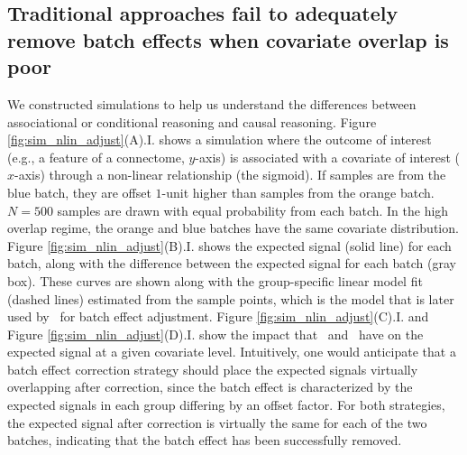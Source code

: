 \subsection{Traditional approaches fail to adequately remove batch effects when covariate overlap is poor}
\label{sec:results:sims}
We constructed simulations to help us understand the differences between associational or conditional reasoning and causal reasoning. Figure \ref{fig:sim_nlin_adjust}(A).I. shows a simulation where the outcome of interest (e.g., a feature of a connectome, $y$-axis) is associated with a covariate of interest ($x$-axis) through a non-linear relationship (the sigmoid). If samples are from the blue batch, they are offset $1$-unit higher than samples from the orange batch. $N=500$ samples are drawn with equal probability from each batch. In the high overlap regime, the orange and blue batches have the same covariate distribution. Figure \ref{fig:sim_nlin_adjust}(B).I. shows the expected signal (solid line) for each batch, along with the difference between the expected signal for each batch (gray box). These curves are shown along with the group-specific linear model fit (dashed lines) estimated from the sample points, which is the model that is later used by \ccombat~for batch effect adjustment. Figure \ref{fig:sim_nlin_adjust}(C).I. and Figure \ref{fig:sim_nlin_adjust}(D).I. show the impact that \ccombat~and \cccombat~have on the expected signal at a given covariate level. Intuitively, one would anticipate that a batch effect correction strategy should place the expected signals virtually overlapping after correction, since the batch effect is characterized by the expected signals in each group differing by an offset factor. For both strategies, the expected signal after correction is virtually the same for each of the two batches, indicating that the batch effect has been successfully removed. 

